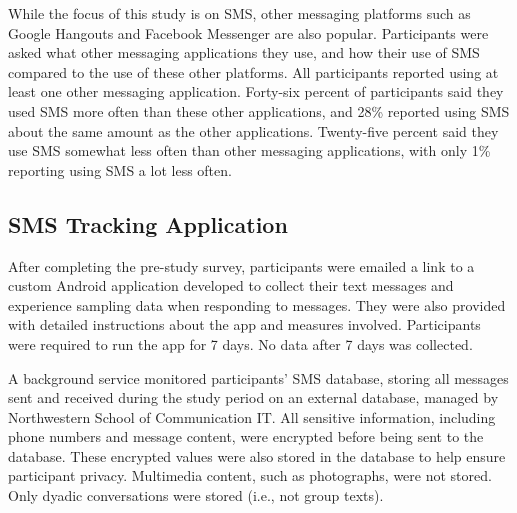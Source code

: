 \documentclass[12pt]{nuthesis}	%
\begin{document}
While the focus of this study is on SMS, other messaging platforms such as Google Hangouts and Facebook Messenger are also popular. Participants were asked what other messaging applications they use, and how their use of SMS compared to the use of these other platforms. All participants reported using at least one other messaging application. Forty-six percent of participants said they used SMS more often than these other applications, and 28\% reported using SMS about the same amount as the other applications. Twenty-five percent said they use SMS somewhat less often than other messaging applications, with only 1\% reporting using SMS a lot less often.


\subsection{SMS Tracking Application}

After completing the pre-study survey, participants were emailed a link to a custom Android application developed to collect their text messages and experience sampling data when responding to messages. They were also provided with detailed instructions about the app and measures involved. Participants were required to run the app for 7 days. No data after 7 days was collected.

A background service monitored participants' SMS database, storing all messages sent and received during the study period on an external database, managed by Northwestern School of Communication IT. All sensitive information, including phone numbers and message content, were encrypted before being sent to the database. These encrypted values were also stored in the database to help ensure participant privacy. Multimedia content, such as photographs, were not stored. Only dyadic conversations were stored (i.e., not group texts).
\end{document}
